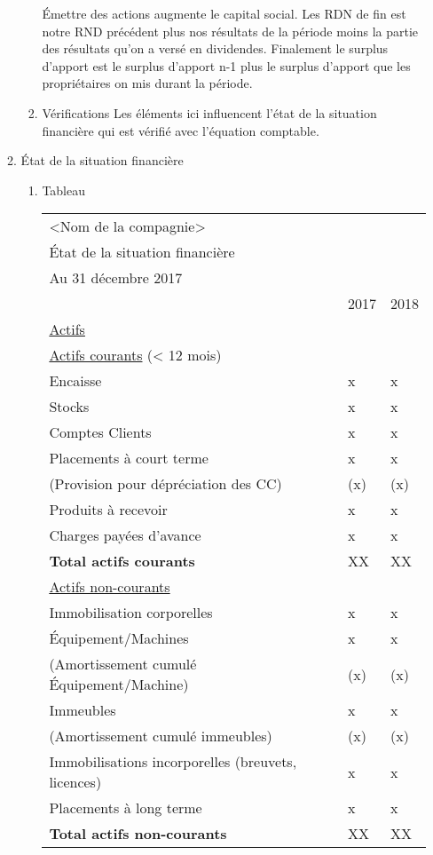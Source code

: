 \documentclass[11pt]{article}
\begin{document}
\begin{enumerate}
\begin{enumerate}
\begin{enumerate}
Émettre des actions augmente le capital social.  Les RDN de fin est notre RND
précédent plus nos résultats de la période moins la partie des résultats qu'on a
versé en dividendes.  Finalement le surplus d'apport est le surplus d'apport n-1
plus le surplus d'apport que les propriétaires on mis durant la période.
\item Vérifications
\label{sec:org6f7f3a0}
Les éléments ici influencent l'état de la situation financière qui est vérifié
avec l'équation comptable.
\end{enumerate}
\item État de la situation financière
\label{sec:org07f91fe}
\begin{enumerate}
\item Tableau
\label{sec:orgb233aee}
\begin{center}
\begin{tabular}{lll}
\hline
<Nom de la compagnie> &  & \\
État de la situation financière &  & \\
Au 31 décembre 2017 &  & \\
\hline
 & 2017 & 2018\\
\hline
\uline{Actifs} &  & \\
\hline
\uline{Actifs courants} (< 12 mois) &  & \\
Encaisse & x & x\\
Stocks & x & x\\
Comptes Clients & x & x\\
Placements à court terme & x & x\\
(Provision pour dépréciation des CC) & (x) & (x)\\
Produits à recevoir & x & x\\
Charges payées d'avance & x & x\\
\textbf{Total actifs courants} & XX & XX\\
\hline
\uline{Actifs non-courants} &  & \\
Immobilisation corporelles & x & x\\
Équipement/Machines & x & x\\
(Amortissement cumulé Équipement/Machine) & (x) & (x)\\
Immeubles & x & x\\
(Amortissement cumulé immeubles) & (x) & (x)\\
Immobilisations incorporelles (breuvets, licences) & x & x\\
Placements à long terme & x & x\\
\textbf{Total actifs non-courants} & XX & XX\\

\end{tabular}
\end{center}
\end{enumerate}
\end{enumerate}
\end{enumerate}
\end{document}
